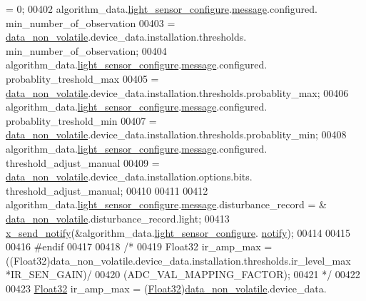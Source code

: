 \begin{DoxyCode}
{{{{{               = 0;
00402     algorithm\_data.\hyperlink{a00016_a8fc7528336e37724802eb52753c7b7a6}{light\_sensor\_configure}.\hyperlink{a00018_a32952acc732e2f16aad59fe0804da5bf}{message}.configured.
      min\_number\_of\_observation
00403                    = \hyperlink{a00060_a76ac5f917f5308dcd83de0d7c94559fb}{data\_non\_volatile}.device\_data.installation.thresholds.
      min\_number\_of\_observation;
00404     algorithm\_data.\hyperlink{a00016_a8fc7528336e37724802eb52753c7b7a6}{light\_sensor\_configure}.\hyperlink{a00018_a32952acc732e2f16aad59fe0804da5bf}{message}.configured.
      probablity\_treshold\_max
00405                    = \hyperlink{a00060_a76ac5f917f5308dcd83de0d7c94559fb}{data\_non\_volatile}.device\_data.installation.thresholds.probablity\_max;
00406     algorithm\_data.\hyperlink{a00016_a8fc7528336e37724802eb52753c7b7a6}{light\_sensor\_configure}.\hyperlink{a00018_a32952acc732e2f16aad59fe0804da5bf}{message}.configured.
      probablity\_treshold\_min
00407                    = \hyperlink{a00060_a76ac5f917f5308dcd83de0d7c94559fb}{data\_non\_volatile}.device\_data.installation.thresholds.probablity\_min;
00408     algorithm\_data.\hyperlink{a00016_a8fc7528336e37724802eb52753c7b7a6}{light\_sensor\_configure}.\hyperlink{a00018_a32952acc732e2f16aad59fe0804da5bf}{message}.configured.
      threshold\_adjust\_manual
00409                    = \hyperlink{a00060_a76ac5f917f5308dcd83de0d7c94559fb}{data\_non\_volatile}.device\_data.installation.options.bits.
      threshold\_adjust\_manual;
00410 
00411 
00412     algorithm\_data.\hyperlink{a00016_a8fc7528336e37724802eb52753c7b7a6}{light\_sensor\_configure}.\hyperlink{a00018_a32952acc732e2f16aad59fe0804da5bf}{message}.disturbance\_record = &
      \hyperlink{a00060_a76ac5f917f5308dcd83de0d7c94559fb}{data\_non\_volatile}.disturbance\_record.light;
00413     \hyperlink{a00036_ae17b0bb16da3c471bb6074bb4c4d0fee}{x\_send\_notify}(&algorithm\_data.\hyperlink{a00016_a8fc7528336e37724802eb52753c7b7a6}{light\_sensor\_configure}.
      \hyperlink{a00018_a8e6a04c2283f9fd7b8dcbc62faba5847}{notify});
00414 
00415 
00416 \textcolor{preprocessor}{#endif}
00417 
00418    \textcolor{comment}{/*}
00419 \textcolor{comment}{     Float32 ir\_amp\_max      = ((Float32)data\_non\_volatile.device\_data.installation.thresholds.ir\_level\_max
      *IR\_SEN\_GAIN)/}
00420 \textcolor{comment}{                               (ADC\_VAL\_MAPPING\_FACTOR);}
00421 \textcolor{comment}{   */}                            
00422                                
00423      \hyperlink{a00072_a87d38f886e617ced2698fc55afa07637}{Float32} ir\_amp\_max      = (\hyperlink{a00072_a87d38f886e617ced2698fc55afa07637}{Float32})\hyperlink{a00060_a76ac5f917f5308dcd83de0d7c94559fb}{data\_non\_volatile}.device\_data.
}}}}}
\end{DoxyCode}
